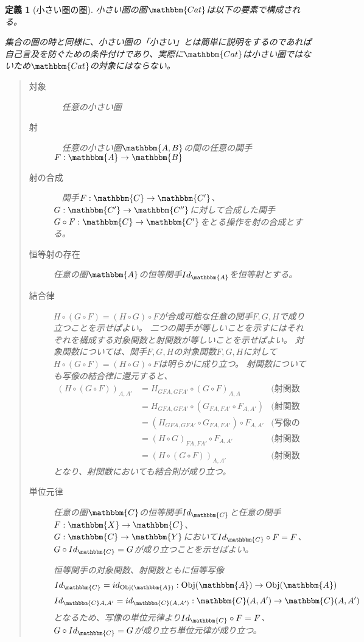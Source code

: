 \documentclass[dvipdfmx]{jsarticle}
\newcommand{\cat}[1]{\mathbbm{#1}}
\newcommand{\arrow}{\rightarrow}
\newcommand{\functor}[3]{#1:\cat{#2}\arrow \cat{#3}}
\newcommand{\obj}[1]{\mathrm{Obj}(\cat{#1})}
\newcommand{\mor}[3]{#1:#2\arrow #3}
\newcommand{\arset}[3]{\cat{#1}(#2,#3)}
\newtheorem{define}{定義}[section]
\numberwithin{proof}{subsection}
\numberwithin{prop}{subsection}
\numberwithin{define}{subsection}
\begin{document}
	\begin{define}[小さい圏の圏]
		小さい圏の圏$\cat{Cat}$は以下の要素で構成される。

		集合の圏の時と同様に、小さい圏の「小さい」とは簡単に説明をするのであれば自己言及を防ぐための条件付けであり、実際に$\cat{Cat}$は小さい圏ではないため$\cat{Cat}$の対象にはならない。
		\begin{quote}
			\begin{description}
				\item[対象]　任意の小さい圏
				\item[射]　任意の小さい圏$\cat{A,B}$の間の任意の関手$\functor{F}{A}{B}$
				\item[射の合成]　関手$\functor{F}{C}{C'}$、$\functor{G}{C'}{C''}$に対して合成した関手$\functor{G\circ F}{C}{C'}$をとる操作を射の合成とする。
				\item[恒等射の存在]任意の圏$\cat{A}$の恒等関手$Id_{\cat{A}}$を恒等射とする。
				\item[結合律]
				$H\circ (G\circ F)=(H\circ G)\circ F$が合成可能な任意の関手$F,G,H$で成り立つことを示せばよい。
				二つの関手が等しいことを示すにはそれぞれを構成する対象関数と射関数が等しいことを示せばよい。
				対象関数については、関手$F,G,H$の対象関数$F,G,H$に対して$H\circ (G\circ F)=(H\circ G)\circ F$は明らかに成り立つ。
				射関数についても写像の結合律に還元すると、
				\begin{align*}
					(H\circ (G\circ F))_{A,A'}&=H_{GFA,GFA'}\circ (G\circ F)_{A,A}&\text{(射関数の合成の定義)}\\
					&=H_{GFA,GFA'}\circ (G_{FA,FA'}\circ F_{A,A'})&\text{(射関数の合成の定義)}\\
					&=(H_{GFA,GFA'}\circ G_{FA,FA'})\circ F_{A,A'}&\text{(写像の結合則)}\\
					&=(H\circ G)_{FA,FA'}\circ F_{A,A'}&\text{(射関数の合成の定義)}\\
					&=(H\circ (G\circ F))_{A,A'}&\text{(射関数の合成の定義)}
				\end{align*}
				となり、射関数においても結合則が成り立つ。
				\item[単位元律]
				任意の圏$\cat{C}$の恒等関手$Id_{\cat{C}}$と任意の関手$\functor{F}{X}{C}$、$\functor{G}{C}{Y}$において$Id_{\cat{C}}\circ F=F$、$G\circ Id_{\cat{C}}=G$が成り立つことを示せばよい。

				恒等関手の対象関数、射関数ともに恒等写像
				\[\mor{Id_\cat{C}=id_{\obj{A}}}{\obj{A}}{\obj{A}}\]
				\[\mor{Id_{\cat{C}A,A'}=id_{\arset{C}{A}{A'}}}{\arset{C}{A}{A'}}{\arset{C}{A}{A'}}\]
				となるため、写像の単位元律より$Id_{\cat{C}}\circ F=F$、$G\circ Id_{\cat{C}}=G$が成り立ち単位元律が成り立つ。
			\end{description}
		\end{quote}
	\end{define}
\end{document}

